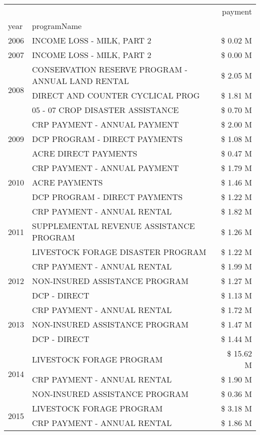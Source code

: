 \begin{tabular}{llr}
\toprule
 &  & payment \\
year & programName &  \\
\midrule
2006 & INCOME LOSS - MILK, PART 2 & \$ 0.02 M \\
\cline{1-3}
2007 & INCOME LOSS - MILK, PART 2 & \$ 0.00 M \\
\cline{1-3}
\multirow[t]{3}{*}{2008} & CONSERVATION RESERVE PROGRAM - ANNUAL LAND RENTAL & \$ 2.05 M \\
 & DIRECT AND COUNTER CYCLICAL PROG & \$ 1.81 M \\
 & 05 - 07 CROP DISASTER ASSISTANCE & \$ 0.70 M \\
\cline{1-3}
\multirow[t]{3}{*}{2009} & CRP PAYMENT - ANNUAL PAYMENT & \$ 2.00 M \\
 & DCP PROGRAM - DIRECT PAYMENTS & \$ 1.08 M \\
 & ACRE DIRECT PAYMENTS & \$ 0.47 M \\
\cline{1-3}
\multirow[t]{3}{*}{2010} & CRP PAYMENT - ANNUAL PAYMENT & \$ 1.79 M \\
 & ACRE PAYMENTS & \$ 1.46 M \\
 & DCP PROGRAM - DIRECT PAYMENTS & \$ 1.22 M \\
\cline{1-3}
\multirow[t]{3}{*}{2011} & CRP PAYMENT - ANNUAL RENTAL & \$ 1.82 M \\
 & SUPPLEMENTAL REVENUE ASSISTANCE PROGRAM & \$ 1.26 M \\
 & LIVESTOCK FORAGE DISASTER PROGRAM & \$ 1.22 M \\
\cline{1-3}
\multirow[t]{3}{*}{2012} & CRP PAYMENT - ANNUAL RENTAL & \$ 1.99 M \\
 & NON-INSURED ASSISTANCE PROGRAM & \$ 1.27 M \\
 & DCP - DIRECT & \$ 1.13 M \\
\cline{1-3}
\multirow[t]{3}{*}{2013} & CRP PAYMENT - ANNUAL RENTAL & \$ 1.72 M \\
 & NON-INSURED ASSISTANCE PROGRAM & \$ 1.47 M \\
 & DCP - DIRECT & \$ 1.44 M \\
\cline{1-3}
\multirow[t]{3}{*}{2014} & LIVESTOCK FORAGE PROGRAM & \$ 15.62 M \\
 & CRP PAYMENT - ANNUAL RENTAL & \$ 1.90 M \\
 & NON-INSURED ASSISTANCE PROGRAM & \$ 0.36 M \\
\cline{1-3}
\multirow[t]{3}{*}{2015} & LIVESTOCK FORAGE PROGRAM & \$ 3.18 M \\
 & CRP PAYMENT - ANNUAL RENTAL & \$ 1.86 M \\

\end{tabular}
